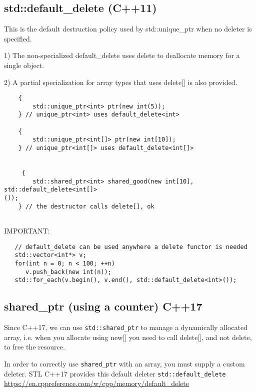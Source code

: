 \subsection{std::default\_delete (C++11)}
\label{sec:std::defalut_delete}

This is the default destruction policy used by std::unique_ptr when no deleter is specified.

1) The non-specialized default_delete uses delete to deallocate memory for a single object.

2) A partial specialization for array types that uses delete[] is also provided.

\begin{lstlisting}
    {
        std::unique_ptr<int> ptr(new int(5));
    } // unique_ptr<int> uses default_delete<int>
 
    {
        std::unique_ptr<int[]> ptr(new int[10]);
    } // unique_ptr<int[]> uses default_delete<int[]>
    
 
     {
        std::shared_ptr<int> shared_good(new int[10], std::default_delete<int[]>
());
    } // the destructor calls delete[], ok
    
\end{lstlisting}

IMPORTANT:
\begin{lstlisting}
   // default_delete can be used anywhere a delete functor is needed
   std::vector<int*> v;
   for(int n = 0; n < 100; ++n)
      v.push_back(new int(n));
   std::for_each(v.begin(), v.end(), std::default_delete<int>());
\end{lstlisting}

\subsection{shared\_ptr (using a counter) C++17}
\label{sec:shared_ptr_C++17}

Since C++17, we can use \verb!std::shared_ptr! to manage a dynamically allocated array, i.e.
when you allocate using new[] you need to call delete[], and not delete, to free the resource.

In order to correctly use \verb!shared_ptr! with an array, you must supply a custom deleter.
STL C++17 provides this default deleter \verb!std::default_delete!
\url{https://en.cppreference.com/w/cpp/memory/default_delete}

\begin{lstlisting}

\end{lstlisting}


